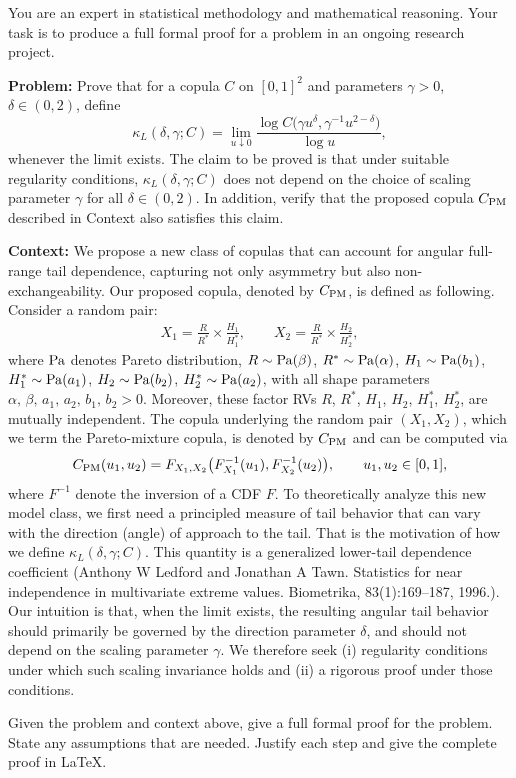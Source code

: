 \documentclass[11pt]{article}
\theoremstyle{definition}
\begin{document}
You are an expert in statistical methodology and mathematical reasoning. Your task is to produce a full formal proof for a problem in an ongoing research project.

\textbf{Problem:} Prove that for a copula $C$ on $[0,1]^2$ and parameters $\gamma>0$, $\delta\in(0,2)$, define
\[
\kappa_L(\delta,\gamma;C)
=
\lim_{u\downarrow 0}
\frac{\log C\!\bigl(\gamma u^\delta,\gamma^{-1}u^{2-\delta}\bigr)}{\log u},
\]
whenever the limit exists.
The claim to be proved is that 
under suitable regularity conditions, $\kappa_L(\delta,\gamma;C)$ does not depend on the choice of scaling parameter $\gamma$ for all $\delta \in (0,2)$. In addition, verify that the proposed copula $C_{\rm PM}$ described in Context also satisfies this claim.

\textbf{Context:} We propose a new class of copulas that can account for {angular full-range tail dependence}, capturing not only asymmetry but also non-exchangeability.
Our proposed copula, denoted by $C_{\rm PM}$, is defined as following.
Consider a random pair:
\begin{align}
    X_1=\frac{R}{R^*}\times \frac{H_1}{H_1^*},
    \qquad
    X_2=\frac{R}{R^*}\times \frac{H_2}{H_2^*},
    \label{eqn:pareto-mixture}
\end{align}
where $\rm Pa$ denotes Pareto distribution, $R\sim{\rm Pa}(\beta)$, \(R^*\sim {\rm Pa}(\alpha)\), \(H_1\sim{\rm Pa}(b_1)\), \(H_1^*\sim{\rm Pa}(a_1)\), \(H_2\sim{\rm Pa}(b_2)\), \(H_2^*\sim{\rm Pa}(a_2)\), with all shape parameters $\alpha,\, \beta,\, a_1,\, a_2,\, b_1,\, b_2>0$. Moreover, these factor RVs $R$, $R^*$, $H_1$, $H_2$, $H_1^*$, $H_2^*$, are mutually independent. 
The copula underlying the random pair $(X_1,X_2)$, which we term the Pareto-mixture copula, is denoted by $C_{\rm PM}$ and can be computed via 
\begin{align}
\label{eqn:copula-pa}
    C_{\rm PM}(u_1,u_2)=F_{X_1,X_2}\big(F_{X_1}^{-1}(u_1), F_{X_2}^{-1}(u_2)\big), \qquad u_1,u_2\in [0,1],
\end{align}
where $F^{-1}$ denote the inversion of a CDF $F$. 
To theoretically analyze this new model class, we first need a principled measure of tail behavior that can vary with the {direction} (angle) of approach to the tail.
That is the motivation of how we define $\kappa_L(\delta,\gamma;C)$.
This quantity is a generalized lower-tail dependence coefficient (Anthony W Ledford and Jonathan A Tawn. Statistics for near independence in multivariate extreme values. Biometrika, 83(1):169--187, 1996.).
Our intuition is that, when the limit exists, the resulting angular tail behavior should primarily be governed by the {direction parameter} $\delta$, and should not depend on the {scaling parameter} $\gamma$.
We therefore seek (i) regularity conditions under which such scaling invariance holds and (ii) a rigorous proof under those conditions.

Given the problem and context above, give a full formal proof for the problem.
State any assumptions that are needed.
Justify each step and give the complete proof in \LaTeX.
\end{document}
